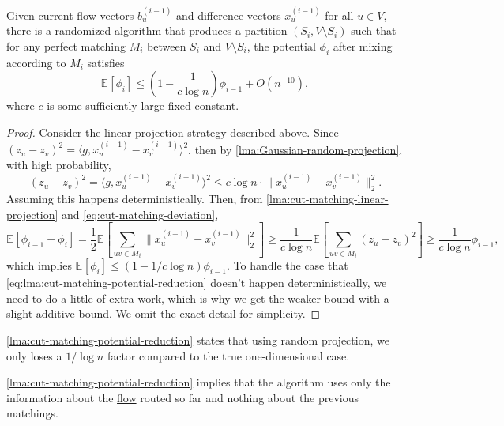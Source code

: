 \begin{lemma}\label{lma:cut-matching-potential-reduction}
	Given current \hyperref[def:flow]{flow} vectors \(b_u^{(i-1)}\) and difference vectors \(x_u^{(i-1)}\) for all \(u \in V\), there is a randomized algorithm that produces a partition \((S_i, V\setminus S_i)\) such that for any perfect matching \(M_i\) between \(S_i\) and \(V\setminus S_i\), the potential \(\phi _{i}\) after mixing according to \(M_i\) satisfies
	\[
		\mathbb{E}_{}[\phi _i]
		\leq \left( 1 - \frac{1}{c \log n} \right) \phi _{i-1} + O(n^{-10}),
	\]
	where \(c\) is some sufficiently large fixed constant.
\end{lemma}
\begin{proof}
	Consider the linear projection strategy described above. Since \((z_u - z_v)^2 = \langle g, x_u^{(i-1)} - x_v^{(i-1)} \rangle ^2\), then by \autoref{lma:Gaussian-random-projection}, with high probability,
	\begin{equation}\label{eq:lma:cut-matching-potential-reduction}
		(z_u - z_v)^2
		= \langle g, x_u^{(i-1)} - x_v^{(i-1)} \rangle ^2
		\leq c \log n \cdot \lVert x_u^{(i-1)} - x_v^{(i-1)} \rVert _2^2.
	\end{equation}
	Assuming this happens deterministically. Then, from \autoref{lma:cut-matching-linear-projection} and \autoref{eq:cut-matching-deviation},
	\[
		\mathbb{E}_{}[\phi _{i-1} - \phi _i]
		= \frac{1}{2} \mathbb{E}_{}\left[\sum_{uv \in M_i} \lVert x_u^{(i-1)} - x_v^{(i-1)} \rVert _2^2 \right]
		\geq \frac{1}{c \log n} \mathbb{E}_{}\left[\sum_{uv \in M_i} (z_u - z_v)^2 \right]
		\geq \frac{1}{c \log n} \phi _{i-1},
	\]
	which implies \(\mathbb{E}_{}[\phi _i] \leq (1 - 1 / c \log n) \phi _{i-1}\). To handle the case that \autoref{eq:lma:cut-matching-potential-reduction} doesn't happen deterministically, we need to do a little of extra work, which is why we get the weaker bound with a slight additive bound. We omit the exact detail for simplicity.
\end{proof}

\begin{intuition}
	\autoref{lma:cut-matching-potential-reduction} states that using random projection, we only loses a \(1 / \log n\) factor compared to the true one-dimensional case.
\end{intuition}

\begin{remark}
	\autoref{lma:cut-matching-potential-reduction} implies that the algorithm uses only the information about the \hyperref[def:flow]{flow} routed so far and nothing about the previous matchings.
\end{remark}

